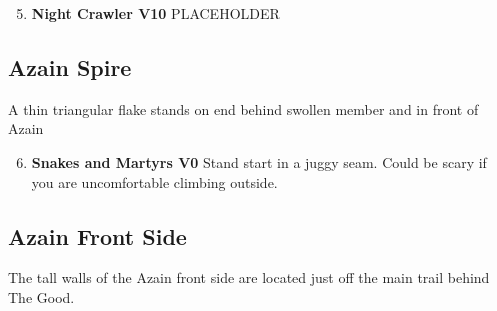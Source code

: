 \begin{multicols*}{2}
				\begin{enumerate}[]
					\setcounter{enumi}{4}
					\item\label{rt:Night Crawler} \colorbox{red!20}{\textbf{Night Crawler V10  } }
					\newline PLACEHOLDER\
				\end{enumerate}

			\subsection*{Azain Spire}\label{bf:Azain Spire}
			A thin triangular flake stands on end behind swollen member and in front of Azain
			
				\begin{enumerate}[]
					\setcounter{enumi}{5}
					\item\label{rt:Snakes and Martyrs} \colorbox{green!20}{\textbf{Snakes and Martyrs V0     } }
					\newline  Stand start in a juggy seam. Could be scary if you are uncomfortable climbing outside.\
				\end{enumerate}
			\subsection*{Azain Front Side}\label{bf:Azain Front Side}
			The tall walls of the Azain front side are located just off the main trail behind The Good.
			

\end{multicols*}
